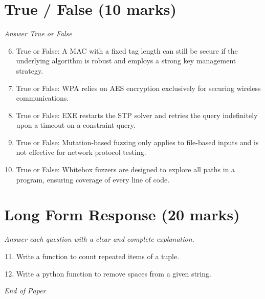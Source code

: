 \documentclass[12pt]{article}
\begin{document}
\section*{True / False (10 marks)}
\textit{Answer True or False}
\begin{enumerate}[label=\arabic*.]
\setcounter{enumi}{5}
\item True or False: A MAC with a fixed tag length can still be secure if the underlying algorithm is robust and employs a strong key management strategy.
\item True or False: WPA relies on AES encryption exclusively for securing wireless communications.
\item True or False: EXE restarts the STP solver and retries the query indefinitely upon a timeout on a constraint query.
\item True or False: Mutation-based fuzzing only applies to file-based inputs and is not effective for network protocol testing.
\item True or False: Whitebox fuzzers are designed to explore all paths in a program, ensuring coverage of every line of code.
\end{enumerate}

\section*{Long Form Response (20 marks)}
\textit{Answer each question with a clear and complete explanation.}
\begin{enumerate}[label=\arabic*.]
\setcounter{enumi}{10}
\item Write a function to count repeated items of a tuple.
\item Write a python function to remove spaces from a given string.
\end{enumerate}

\vfill
\noindent\textit{End of Paper}
\end{document}
